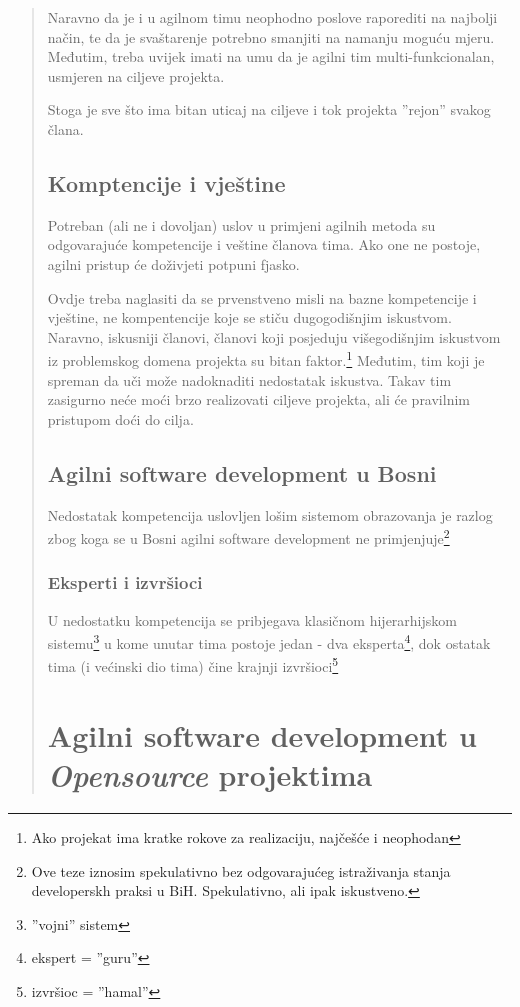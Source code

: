 \documentclass[lmodern, utf8, zavrsni]{fit}
\begin{document}
\begin{quote}
Naravno da je i u agilnom timu neophodno poslove raporediti na najbolji način, te da je svaštarenje potrebno smanjiti na namanju moguću mjeru.
Međutim, treba uvijek imati na umu da je agilni tim multi-funkcionalan, usmjeren na ciljeve projekta.

Stoga je sve što ima bitan uticaj na ciljeve i tok projekta ''rejon'' svakog člana.

\section{Komptencije i vještine}

Potreban (ali ne i dovoljan) uslov u primjeni agilnih metoda su odgovarajuće kompetencije i veštine članova tima. Ako one ne postoje, agilni pristup će doživjeti potpuni fjasko.

Ovdje treba naglasiti da se prvenstveno misli na bazne kompetencije i vještine, ne kompentencije koje se stiču dugogodišnjim iskustvom. Naravno, iskusniji članovi, članovi koji posjeduju višegodišnjim iskustvom iz problemskog domena projekta su bitan faktor.\footnote{Ako projekat ima kratke rokove za realizaciju, najčešće i neophodan} Međutim, tim koji je spreman da uči može nadoknaditi nedostatak iskustva. Takav tim zasigurno neće moći brzo realizovati ciljeve projekta, ali će pravilnim pristupom doći do cilja.

\section{Agilni software development u Bosni}

Nedostatak kompetencija uslovljen lošim sistemom obrazovanja je razlog zbog koga se u Bosni agilni software development ne primjenjuje\footnote{Ove teze iznosim spekulativno bez odgovarajućeg istraživanja stanja developerskh praksi u BiH. Spekulativno, ali ipak iskustveno.}

\subsection{Eksperti i izvršioci}

U nedostatku kompetencija se pribjegava klasičnom hijerarhijskom sistemu\footnote{''vojni'' sistem} u kome unutar tima postoje jedan - dva eksperta\footnote{ekspert = ''guru''}, dok ostatak tima (i većinski dio tima) čine krajnji izvršioci\footnote{izvršioc = ''hamal''}


\chapter{Agilni software development u \emph{Opensource} projektima}


\end{quote}
\end{document}
